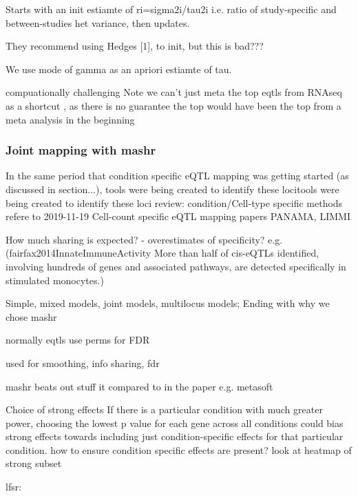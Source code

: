 Starts with an init estiamte of ri=sigma2i/tau2i i.e. ratio of study-specific and between-studies het variance, then updates.

They recommend using Hedges [1], to init, but this is bad???

We use mode of gamma as an apriori estiamte of tau.

compuationally challenging
Note we can't just meta the top eqtls from RNAseq as a shortcut , as there is no guarantee the top would have been the top from a meta analysis in the beginning

\subsubsection{Joint mapping with mashr}


In the same period that condition specific eQTL mapping was getting started (as discussed in section...), tools were being created to identify these locitools were being created to identify these loci
review: condition/Cell-type specific methods
refere to 2019-11-19 Cell-count specific eQTL mapping papers
PANAMA, LIMMI

How much sharing is expected?
- overestimates of specificity? e.g. (fairfax2014InnateImmuneActivity More than half of cis-eQTLs identified, involving hundreds of genes and associated pathways, are detected specifically in stimulated monocytes.)

Simple, mixed models, joint models, multilocus models; Ending with why we chose mashr

normally eqtls use perms for FDR

used for smoothing, info sharing, fdr

mashr beats out stuff it compared to in the paper e.g. metasoft

Choice of strong effects
If there is a particular condition with much greater power, choosing the lowest p value for each gene across all conditions could bias strong effects towards including just condition-specific effects for that particular condition.
how to ensure condition specific effects are present? look at heatmap of strong subset

lfsr:


